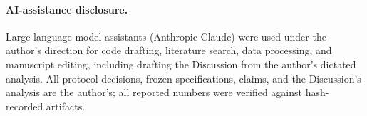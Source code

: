 \documentclass[runningheads]{llncs}
\begin{document}
\paragraph{AI-assistance disclosure.} Large-language-model assistants
(Anthropic Claude) were used under the author's direction for code
drafting, literature search, data processing, and manuscript editing,
including drafting the Discussion from the author's dictated analysis.
All protocol decisions, frozen specifications, claims, and the
Discussion's analysis are the author's; all reported numbers were
verified against hash-recorded artifacts.
\end{document}
